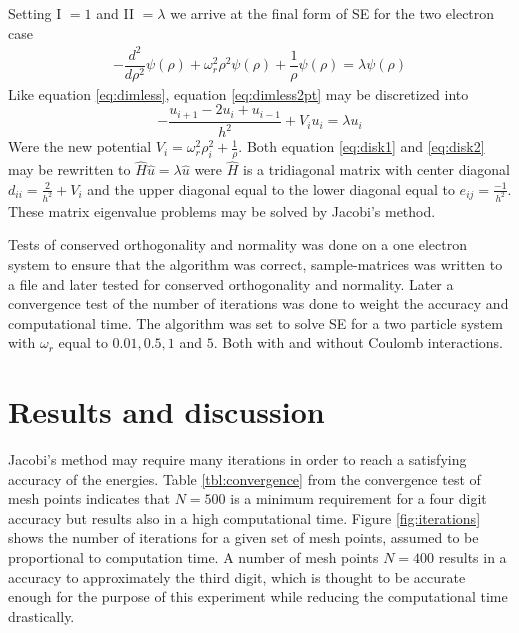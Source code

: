 \documentclass[twoside,twocolumn]{article}
\newcommand{\nl}{
	
	\medskip
	\noindent
}
\begin{document}
	Setting I $= 1$ and II $=\lambda$ we arrive at the final form of SE for the two electron case
	\begin{align}
	-\dfrac{d^2}{d\rho^2} \psi(\rho) + \omega_r^2\rho^2\psi(\rho) +\dfrac{1}{\rho}\psi(\rho) = \lambda \psi(\rho)\label{eq:dimless2pt}
	\end{align}
	Like equation \ref{eq:dimless}, equation \ref{eq:dimless2pt} may be discretized into
	\begin{equation}
	-\frac{u_{i+1}-2u_i+u_{i-1}}{h^2}+V_iu_i = \lambda u_i\label{eq:disk2}
	\end{equation}
	Were the new potential $V_i=\omega_r^2\rho_i^2+\frac{1}{\rho}$. Both equation \ref{eq:disk1} and \ref{eq:disk2} may be rewritten to $\hat{H}\hat{u}=\lambda\hat{u}$ were $\hat{H}$ is a tridiagonal matrix with center diagonal $d_{ii}=\frac{2}{h^2}+V_i$ and the upper diagonal equal to the lower diagonal equal to $e_{ij}=\frac{-1}{h^2}$. These matrix eigenvalue problems may be solved by Jacobi's method.\nl
	
	Tests of conserved orthogonality and normality was done on a one electron system to ensure that the algorithm was correct, sample-matrices was written to a file and later tested for conserved orthogonality and normality. Later a convergence test of the number of iterations was done to weight the accuracy and computational time. The algorithm was set to solve SE for a two particle system with $\omega_r$ equal to $0.01,0.5,1$ and $5$. Both with and without Coulomb interactions.
	\section{Results and discussion}
	Jacobi's method may require many iterations in order to reach a satisfying accuracy of the energies. Table \ref{tbl:convergence} from the convergence test of mesh points indicates that $N=500$ is a minimum requirement for a four digit accuracy but results also in a high computational time. Figure \ref{fig:iterations} shows the number of iterations for a given set of mesh points, assumed to be proportional to computation time.
	A number of mesh points $N=400$ results in a accuracy to approximately the third digit, which is thought to be accurate enough for the purpose of this experiment while  reducing the computational time drastically.\nl
	
\end{document}
